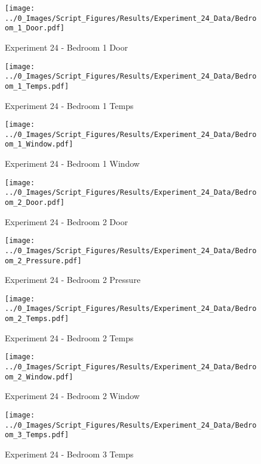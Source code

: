 	\begin{figure}[H]
		\centering
		\texttt{[image: ../0\_Images/Script\_Figures/Results/Experiment\_24\_Data/Bedroom\_1\_Door.pdf]}
		\caption[]{Experiment 24 - Bedroom 1 Door}
	\end{figure}
 

	\begin{figure}[H]
		\centering
		\texttt{[image: ../0\_Images/Script\_Figures/Results/Experiment\_24\_Data/Bedroom\_1\_Temps.pdf]}
		\caption[]{Experiment 24 - Bedroom 1 Temps}
	\end{figure}
 
	\clearpage

	\begin{figure}[H]
		\centering
		\texttt{[image: ../0\_Images/Script\_Figures/Results/Experiment\_24\_Data/Bedroom\_1\_Window.pdf]}
		\caption[]{Experiment 24 - Bedroom 1 Window}
	\end{figure}
 

	\begin{figure}[H]
		\centering
		\texttt{[image: ../0\_Images/Script\_Figures/Results/Experiment\_24\_Data/Bedroom\_2\_Door.pdf]}
		\caption[]{Experiment 24 - Bedroom 2 Door}
	\end{figure}
 
	\clearpage

	\begin{figure}[H]
		\centering
		\texttt{[image: ../0\_Images/Script\_Figures/Results/Experiment\_24\_Data/Bedroom\_2\_Pressure.pdf]}
		\caption[]{Experiment 24 - Bedroom 2 Pressure}
	\end{figure}
 

	\begin{figure}[H]
		\centering
		\texttt{[image: ../0\_Images/Script\_Figures/Results/Experiment\_24\_Data/Bedroom\_2\_Temps.pdf]}
		\caption[]{Experiment 24 - Bedroom 2 Temps}
	\end{figure}
 
	\clearpage

	\begin{figure}[H]
		\centering
		\texttt{[image: ../0\_Images/Script\_Figures/Results/Experiment\_24\_Data/Bedroom\_2\_Window.pdf]}
		\caption[]{Experiment 24 - Bedroom 2 Window}
	\end{figure}
 

	\begin{figure}[H]
		\centering
		\texttt{[image: ../0\_Images/Script\_Figures/Results/Experiment\_24\_Data/Bedroom\_3\_Temps.pdf]}
		\caption[]{Experiment 24 - Bedroom 3 Temps}
	\end{figure}
 
